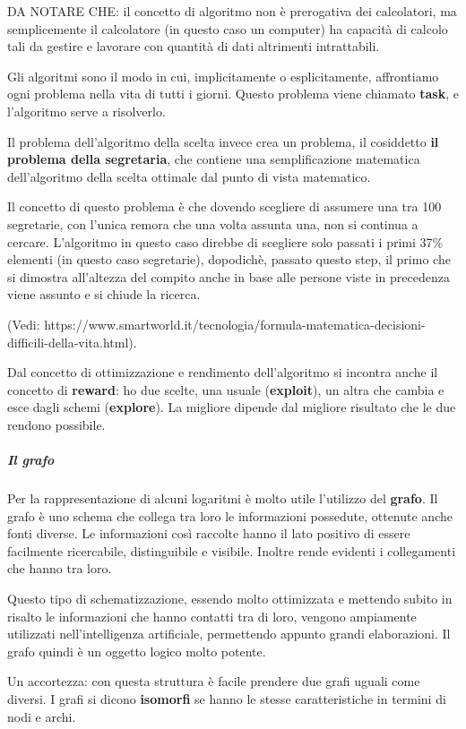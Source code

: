 \documentclass[
  paper=a4,
  oneside  ,captions=tableheading
]{scrbook}
\begin{document}
DA NOTARE CHE: il concetto di algoritmo non è prerogativa dei
calcolatori, ma semplicemente il calcolatore (in questo caso un
computer) ha capacità di calcolo tali da gestire e lavorare con quantità
di dati altrimenti intrattabili.

Gli algoritmi sono il modo in cui, implicitamente o esplicitamente,
affrontiamo ogni problema nella vita di tutti i giorni. Questo problema
viene chiamato \textbf{task}, e l'algoritmo serve a risolverlo.

Il problema dell'algoritmo della scelta invece crea un problema, il
cosiddetto \textbf{il problema della segretaria}, che contiene una
semplificazione matematica dell'algoritmo della scelta ottimale dal
punto di vista matematico.

Il concetto di questo problema è che dovendo scegliere di assumere una
tra 100 segretarie, con l'unica remora che una volta assunta una, non si
continua a cercare. L'algoritmo in questo caso direbbe di scegliere solo
passati i primi 37\% elementi (in questo caso segretarie), dopodichè,
passato questo step, il primo che si dimostra all'altezza del compito
anche in base alle persone viste in precedenza viene assunto e si chiude
la ricerca.

(Vedi: https://www.smartworld.it/tecnologia/formula-matematica-decisioni-difficili-della-vita.html).

Dal concetto di ottimizzazione e rendimento dell'algoritmo si incontra
anche il concetto di \textbf{reward}: ho due scelte, una usuale
(\textbf{exploit}), un altra che cambia e esce dagli schemi
(\textbf{explore}). La migliore dipende dal migliore risultato che le
due rendono possibile.

\hypertarget{il-grafo}{%
\subparagraph{Il grafo}\label{il-grafo}}

Per la rappresentazione di alcuni logaritmi è molto utile l'utilizzo del
\textbf{grafo}. Il grafo è uno schema che collega tra loro le
informazioni possedute, ottenute anche fonti diverse. Le informazioni
così raccolte hanno il lato positivo di essere facilmente ricercabile,
distinguibile e visibile. Inoltre rende evidenti i collegamenti che
hanno tra loro.

Questo tipo di schematizzazione, essendo molto ottimizzata e mettendo
subito in risalto le informazioni che hanno contatti tra di loro,
vengono ampiamente utilizzati nell'intelligenza artificiale, permettendo
appunto grandi elaborazioni. Il grafo quindi è un oggetto logico molto
potente.

Un accortezza: con questa struttura è facile prendere due grafi uguali
come diversi. I grafi si dicono \textbf{isomorfi} se hanno le stesse
caratteristiche in termini di nodi e archi.
\end{document}
